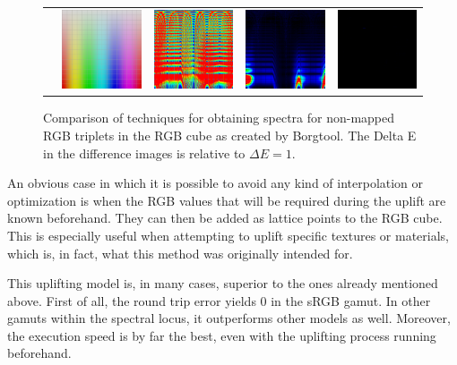 \begin{figure}[t]
{\begin{tabular}{ccccc}
			& 
			\includegraphics[width=.21\textwidth]{img/uplifting_texture_original.png}
			&\hspace{0.5em}
			\includegraphics[width=.21\textwidth]{img/uplifting_diff_originalNeighbor.png}
			& 
			\includegraphics[width=.21\textwidth]{img/uplifting_diff_originalCoef.png}
			& 
			\includegraphics[width=.21\textwidth]{img/uplifting_diff_originalSpectra.png}\\
		\end{tabular}
	}
	\caption{Comparison of techniques for obtaining spectra for non-mapped RGB triplets in the RGB cube as created by Borgtool. The Delta E in the difference images is relative to $\Delta E = 1$.}
	\label{fig:sigmoidTexture}
\end{figure}

An obvious case in which it is possible to avoid any kind of interpolation or optimization is when the RGB values that will be required during the uplift are known beforehand. They can then be added as lattice points to the RGB cube. This is especially useful when attempting to uplift specific textures or materials, which is, in fact, what this method was originally intended for.

This uplifting model is, in many cases, superior to the ones already mentioned above. First of all, the round trip error yields 0 in the sRGB gamut. In other gamuts within the spectral locus, it outperforms other models as well. Moreover, the execution speed is by far the best, even with the uplifting process running beforehand. 

